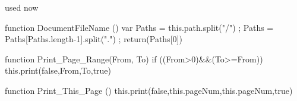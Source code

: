 
 used now 

  function DocumentFileName ()
    { var Paths = this.path.split("/") ;
      Paths = Paths[Paths.length-1].split(".") ;
      return(Paths[0]) }

  function Print_Page_Range(From, To) %
    { if ((From>0)&&(To>=From)) 
        { this.print(false,From,To,true) } }

  function Print_This_Page () 
    { this.print(false,this.pageNum,this.pageNum,true) } 

\stopJSpreamble





\endinput
